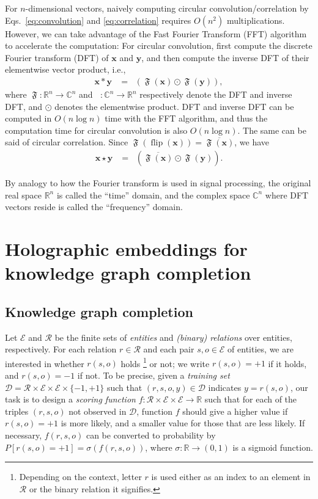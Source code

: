 \documentclass[11pt,a4paper]{article}
\def\mat#1{\boldsymbol{\mathbf{#1}}}
\def\Cset{\mathbb{C}}
\def\Rset{\mathbb{R}}
\let\cconv*
\let\ccorr\star
\let\hprod\odot
\def\DFT{\mathop{\mathfrak{F}}}
\def\IDFT{\mathop{\mathfrak{F}^{-1}}}
\def\flip{\mathop{\text{flip}}}
\begin{document}
For $n$-dimensional vectors,
naively computing circular convolution/correlation
by Eqs.~\eqref{eq:convolution} and \eqref{eq:correlation} 
requires $O(n^2)$ multiplications.
However, we can take advantage of
the Fast Fourier Transform (FFT) algorithm
to accelerate the computation:
For circular convolution,
first compute the discrete Fourier transform (DFT)
of $\mat{x}$ and $\mat{y}$,
and then compute the inverse DFT of their elementwise vector product, i.e.,
\begin{align*}
  \mat{x}\cconv\mat{y} &= \IDFT(\DFT(\mat{x}) \hprod \DFT(\mat{y})),
\end{align*}
where $\DFT: \Rset^n \to \Cset^n$ and $\IDFT: \Cset^n \to \Rset^n$
respectively denote
the DFT %
and inverse DFT, %
and $\hprod$ denotes the elementwise product.
DFT and inverse DFT can be computed in $O(n\log n)$ time
with the FFT algorithm, and thus
the computation time for
circular convolution is also $O(n\log n)$.
The same can be said of circular correlation.
Since $\DFT(\flip(\mat{x})) = \overline{\DFT(\mat{x})}$, we have
\begin{align}
  \mat{x}\ccorr\mat{y} &= \IDFT(\overline{\DFT(\mat{x})} \hprod \DFT(\mat{y})).
  \label{eq:correlation-dft}
\end{align}

By analogy to how the Fourier transform is used in signal processing,
the original real space $\Rset^n$ %
is called the ``time'' domain,
and the complex space $\Cset^n$ where DFT vectors reside %
is called the ``frequency'' domain.


\section{Holographic embeddings for knowledge graph completion}
\label{sec:knowledge-graph-completion}

\subsection{Knowledge graph completion}
\label{sec:kowledge-graph-completion-task}

Let $\mathcal{E}$ and $\mathcal{R}$ be the finite sets of \emph{entities} and \emph{(binary) relations}
over entities,
respectively.
For each relation $r \in \mathcal{R}$ and each pair $s,o \in \mathcal{E}$ of entities,
we are interested in whether $r(s,o)$ holds%
\footnote{
  Depending on the context,
  letter $r$ is used either as an index to an element in $\mathcal{R}$ or the binary relation it signifies.
} or not;
we write $r(s,o)=+1$ if it holds, and $r(s,o)=-1$ if not.
To be precise,
given a \emph{training set}
$\mathcal{D} = \mathcal{R} \times \mathcal{E} \times \mathcal{E} \times \{-1, +1\}$
such that $(r, s, o, y) \in \mathcal{D}$
indicates $y = r(s,o)$,
our task is to design a \emph{scoring function}
$f: \mathcal{R} \times \mathcal{E} \times \mathcal{E} \to \Rset$
such that
for each of the triples $(r,s,o)$ not observed in $\mathcal{D}$,
function $f$ should give a higher value if $r(s,o) = +1$ is more likely,
and a smaller value for those that are less likely.
If necessary, $f(r,s,o)$ can be converted to probability by $P[r(s,o) = +1] = \sigma(f(r,s,o))$,
where $\sigma: \Rset \to (0,1)$ is a sigmoid function.
\end{document}
